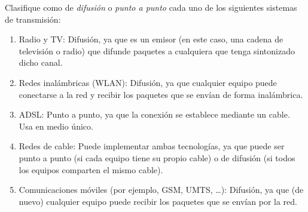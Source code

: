 \begin{ejercicio}
    Clasifique como de \textit{difusión} o \textit{punto a punto} cada uno de los siguientes sistemas de transmisión:
    \begin{enumerate}
        \item Radio y TV\@: Difusión, ya que es un emisor (en este caso, una cadena de televisión o radio) que difunde paquetes a cualquiera que tenga sintonizado dicho canal.
        \item Redes inalámbricas (WLAN): Difusión, ya que cualquier equipo puede conectarse a la red y recibir los paquetes que se envían de forma inalámbrica.
        \item ADSL\@: Punto a punto, ya que la conexión se establece mediante un cable. Usa en medio único.
        \item Redes de cable: Puede implementar ambas tecnologías, ya que puede ser punto a punto (si cada equipo tiene su propio cable) o de difusión (si todos los equipos comparten el mismo cable).
        \item Comunicaciones móviles (por ejemplo, GSM, UMTS, \ldots): Difusión, ya que (de nuevo) cualquier equipo puede recibir los paquetes que se envían por la red.
    \end{enumerate}
\end{ejercicio}

